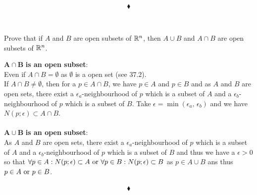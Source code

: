 $$\blacklozenge$$\\


\subsection{}
\begin{tcolorbox}
Prove that if $A$ and $B$ are open subsets of $\mathbb{R}^{n}$, then $A\cup B$ and $A\cap B$ are open subsets of $\mathbb{R}^n$.
\end{tcolorbox}
$\mathbf{A\cap B}$ \textbf{is an open subset}:\\
 Even if $A\cap B=\emptyset$ as $\emptyset$ is a open set (see $\mathbf{37.2}$).\\
If  $A\cap B\neq\emptyset$,  then for a $p\in  A\cap B$, we have   $p\in A$ and $p\in B$ and as $A$ and $B$ are open sets, there exist a $\epsilon_a$-neighbourhood of $p$ which is a subset of $A$ and a $\epsilon_b$-neighbourhood of $p$ which is a subset of $B$. Take $\epsilon = \min (\epsilon_a,\, \epsilon_b)$ and we have $N(p;\epsilon)\subset A\cap B$.\\\\
$\mathbf{A\cup B}$ \textbf{is an open subset}:\\
As $A$ and $B$ are open sets, there exist a $\epsilon_a$-neighbourhood of $p$ which is a subset of $A$ and a $\epsilon_b$-neighbourhood of $p$ which is a subset of $B$ and thus we have a $\epsilon>0$ so that $\forall p\in A: N(p;\epsilon)\subset A \text{ or } \forall p\in B: N(p;\epsilon)\subset B$ as $p\in A\cup B$ ans thus $p\in A\text{ or } p\in B$.\\\\

$$\blacklozenge$$


